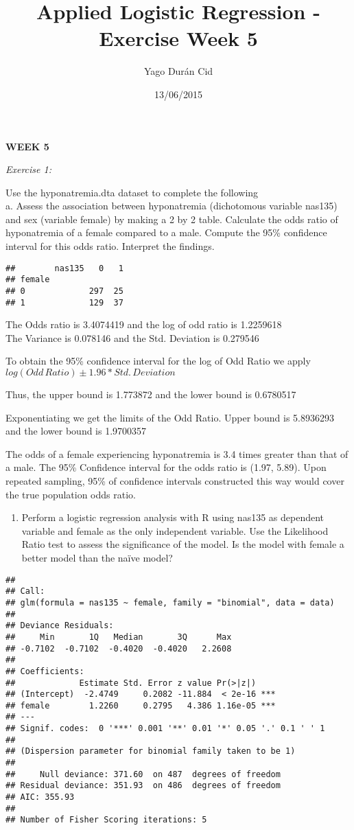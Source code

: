 \documentclass[]{article}
\title{Applied Logistic Regression - Exercise Week 5}
\author{Yago Durán Cid}
\date{13/06/2015}
\begin{document}
\maketitle


\textbf{WEEK 5}

\emph{Exercise 1:}

Use the hyponatremia.dta dataset to complete the following\\a. Assess
the association between hyponatremia (dichotomous variable nas135) and
sex (variable female) by making a 2 by 2 table. Calculate the odds ratio
of hyponatremia of a female compared to a male. Compute the 95\%
confidence interval for this odds ratio. Interpret the findings.

\begin{verbatim}
##        nas135   0   1
## female               
## 0             297  25
## 1             129  37
\end{verbatim}

The Odds ratio is 3.4074419 and the log of odd ratio is 1.2259618\\The
Variance is 0.078146 and the Std. Deviation is 0.279546

To obtain the 95\% confidence interval for the log of Odd Ratio we apply
$log(Odd\,Ratio)\pm1.96*Std.\,Deviation$

Thus, the upper bound is 1.773872 and the lower bound is 0.6780517

Exponentiating we get the limits of the Odd Ratio. Upper bound is
5.8936293 and the lower bound is 1.9700357

The odds of a female experiencing hyponatremia is 3.4 times greater than
that of a male. The 95\% Confidence interval for the odds ratio is
(1.97, 5.89). Upon repeated sampling, 95\% of confidence intervals
constructed this way would cover the true population odds ratio.

\begin{enumerate}
\def\labelenumi{\alph{enumi}.}
\setcounter{enumi}{1}
\itemsep1pt\parskip0pt
\item
  Perform a logistic regression analysis with R using nas135 as
  dependent variable and female as the only independent variable. Use
  the Likelihood Ratio test to assess the significance of the model. Is
  the model with female a better model than the naïve model?
\end{enumerate}

\begin{verbatim}
## 
## Call:
## glm(formula = nas135 ~ female, family = "binomial", data = data)
## 
## Deviance Residuals: 
##     Min       1Q   Median       3Q      Max  
## -0.7102  -0.7102  -0.4020  -0.4020   2.2608  
## 
## Coefficients:
##             Estimate Std. Error z value Pr(>|z|)    
## (Intercept)  -2.4749     0.2082 -11.884  < 2e-16 ***
## female        1.2260     0.2795   4.386 1.16e-05 ***
## ---
## Signif. codes:  0 '***' 0.001 '**' 0.01 '*' 0.05 '.' 0.1 ' ' 1
## 
## (Dispersion parameter for binomial family taken to be 1)
## 
##     Null deviance: 371.60  on 487  degrees of freedom
## Residual deviance: 351.93  on 486  degrees of freedom
## AIC: 355.93
## 
## Number of Fisher Scoring iterations: 5
\end{verbatim}
\end{document}
